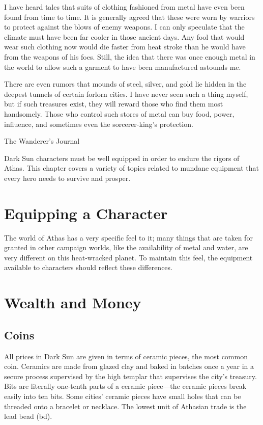 {I have heard tales that suits of clothing fashioned from metal have even been found from time to time. It is generally agreed that these were worn by warriors to protect against the blows of enemy weapons. I can only speculate that the climate must have been far cooler in those ancient days. Any fool that would wear such clothing now would die faster from heat stroke than he would have from the weapons of his foes. Still, the idea that there was once enough metal in the world to allow such a garment to have been manufactured astounds me.

There are even rumors that mounds of steel, silver, and gold lie hidden in the deepest tunnels of certain forlorn cities. I have never seen such a thing myself, but if such treasures exist, they will reward those who find them most handsomely. Those who control such stores of metal can buy food, power, influence, and sometimes even the sorcerer-king's protection.}
{The Wanderer's Journal}

Dark Sun characters must be well equipped in order to endure the rigors of Athas. This chapter covers a variety of topics related to mundane equipment that every hero needs to survive and prosper.

\section{Equipping a Character}
The world of Athas has a very specific feel to it; many things that are taken for granted in other campaign worlds, like the availability of metal and water, are very different on this heat-wracked planet. To maintain this feel, the equipment available to characters should reflect these differences.

\section{Wealth and Money}
\subsection{Coins}
All prices in Dark Sun are given in terms of ceramic pieces, the most common coin. Ceramics are made from glazed clay and baked in batches once a year in a secure process supervised by the high templar that supervises the city's treasury. Bits are literally one‐tenth parts of a ceramic piece---the ceramic pieces break easily into ten bits. Some cities' ceramic pieces have small holes that can be threaded onto a bracelet or necklace. The lowest unit of Athasian trade is the lead bead (bd).

